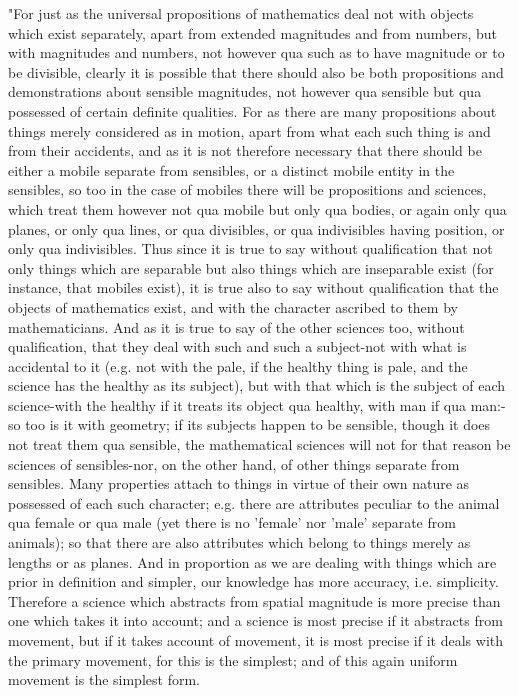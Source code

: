 "For just as the universal propositions of mathematics deal not with
objects which exist separately, apart from extended magnitudes and
from numbers, but with magnitudes and numbers, not however qua such
as to have magnitude or to be divisible, clearly it is possible that
there should also be both propositions and demonstrations about sensible
magnitudes, not however qua sensible but qua possessed of certain
definite qualities. For as there are many propositions about things
merely considered as in motion, apart from what each such thing is
and from their accidents, and as it is not therefore necessary that
there should be either a mobile separate from sensibles, or a distinct
mobile entity in the sensibles, so too in the case of mobiles there
will be propositions and sciences, which treat them however not qua
mobile but only qua bodies, or again only qua planes, or only qua
lines, or qua divisibles, or qua indivisibles having position, or
only qua indivisibles. Thus since it is true to say without qualification
that not only things which are separable but also things which are
inseparable exist (for instance, that mobiles exist), it is true also
to say without qualification that the objects of mathematics exist,
and with the character ascribed to them by mathematicians. And as
it is true to say of the other sciences too, without qualification,
that they deal with such and such a subject-not with what is accidental
to it (e.g. not with the pale, if the healthy thing is pale, and the
science has the healthy as its subject), but with that which is the
subject of each science-with the healthy if it treats its object qua
healthy, with man if qua man:-so too is it with geometry; if its subjects
happen to be sensible, though it does not treat them qua sensible,
the mathematical sciences will not for that reason be sciences of
sensibles-nor, on the other hand, of other things separate from sensibles.
Many properties attach to things in virtue of their own nature as
possessed of each such character; e.g. there are attributes peculiar
to the animal qua female or qua male (yet there is no 'female' nor
'male' separate from animals); so that there are also attributes which
belong to things merely as lengths or as planes. And in proportion
as we are dealing with things which are prior in definition and simpler,
our knowledge has more accuracy, i.e. simplicity. Therefore a science
which abstracts from spatial magnitude is more precise than one which
takes it into account; and a science is most precise if it abstracts
from movement, but if it takes account of movement, it is most precise
if it deals with the primary movement, for this is the simplest; and
of this again uniform movement is the simplest form. 

